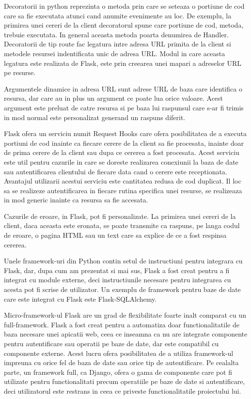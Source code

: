 Decoratorii in python reprezinta o metoda prin care se seteaza o portiune de cod care sa fie executata atunci cand anumite evenimente au loc. De exemplu, 
la primirea unei cereri de la client decoratorul spune care portiune de cod, metoda, trebuie executata. In general aceasta metoda poarta denumirea de 
Handler. Decoratorii de tip route fac legatura intre adresa URL primita de la client si metodele resursei indentificata unic de adresa URL. Modul in  
care aceasta legatura este realizata de Flask, este prin creearea unei mapari a adreselor URL pe resurse.

Argumentele dinamice in adresa URL sunt adrese URL de baza care identifica o resursa, dar care au in plus un argument ce poate lua orice valoare. Acest 
argument este preluat de catre resursa si pe baza lui raspunsul care s-ar fi trimis in mod normal este personalizat generand un raspuns diferit.

Flask ofera un serviciu numit Request Hooks care ofera posibilitatea de a executa portiuni de cod inainte ca fiecare cerere de la client sa fie procesata, 
inainte doar de prima cerere de la client sau dupa ce cererea a fost procesata. Acest serviciu este util pentru cazurile in care se doreste realizarea 
conexiunii la baza de date sau autentificarea clientului de fiecare data cand o cerere este receptionata. Avantajul utilizarii acestui serviciu este 
cantitatea redusa de cod duplicat. Il loc sa se realizeze autentificarea in fiecare rutina specifica unei resurse, se realizeaza in mod generic inainte ca 
resursa sa fie accesata.

Cazurile de eroare, in Flask, pot fi personalizate. La primirea unei cereri de la client, daca aceasta este eronata, se poate transmite ca raspuns, pe langa 
codul de eroare, o pagina HTML sau un text care sa explice de ce a fost respinsa cererea.

Unele framework-uri din Python contin setul de instructiuni pentru integrara cu Flask, dar, dupa cum am prezentat si mai sus, Flask a fost creat pentru a fi 
integrat cu module externe, deci instructiunile necesare pentru integrarea cu acesta pot fi scrise de utilizator. Un exemplu de framework pentru baze de date 
care este integrat cu Flask este Flask-SQLAlchemy.

Micro-framework-ul Flask are un grad de flexibilitate foarte inalt comparat cu un full-framework. Flask a fost creat pentru a automatiza doar functionalitatile 
de baza necesare unei apicatii web, ceea ce inseamna ca nu are integrate componente pentru autentificare sau operatii pe baze de date, dar este 
compatibil cu componente externe. Acest lucru ofera posibilitatea de a utiliza framework-ul impreuna cu orice fel de baza de date sau orice tip de 
autentificare. Pe cealalta parte, un framework full, ca Django, ofera o gama de componente care pot fi utilizate pentru functionalitati precum 
operatiile pe baze de date si autentificare, deci utilizatorul este restrans in ceea ce priveste functionalitatile proiectului lui.

